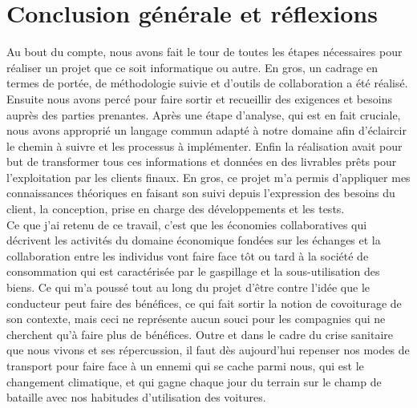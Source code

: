 \chapter{Conclusion générale et réflexions}
\label{Conclusion}
Au bout du compte, nous avons fait le tour de toutes les étapes nécessaires pour réaliser un projet que ce soit informatique ou autre.\newline
En gros, un cadrage en termes de portée, de méthodologie suivie et d'outils de collaboration a été réalisé.\newline
Ensuite nous avons percé pour faire sortir et recueillir des exigences et besoins auprès des parties prenantes.\newline 
Après une étape d'analyse, qui est en fait cruciale, nous avons approprié un langage commun adapté à notre domaine afin d’éclaircir le chemin à suivre et les processus à implémenter.\newline
Enfin la réalisation avait pour but de transformer tous ces informations et données en des livrables prêts pour l'exploitation par les clients finaux.\newline
En gros, ce projet m'a permis d'appliquer mes connaissances théoriques en faisant son suivi depuis l'expression des besoins du client, la conception, prise en charge des développements et les tests.\\[1in]
Ce que j'ai retenu de ce travail, c'est que les économies collaboratives qui décrivent les activités du domaine économique fondées sur les échanges et la collaboration entre les individus vont faire face tôt ou tard à la société de consommation qui est caractérisée par le gaspillage et la sous-utilisation des biens. Ce qui m'a poussé tout au long du projet d'être contre l'idée que le conducteur peut faire des bénéfices, ce qui fait sortir la notion de covoiturage de son contexte, mais ceci ne représente aucun souci pour les compagnies qui ne cherchent qu'à faire plus de bénéfices.\newline
Outre et dans le cadre du crise sanitaire que nous vivons et ses répercussion, il faut dès aujourd'hui repenser nos modes de transport pour faire face à un ennemi qui se cache parmi nous, qui est le changement climatique, et qui gagne chaque jour du terrain sur le champ de bataille avec nos habitudes d'utilisation des voitures.
